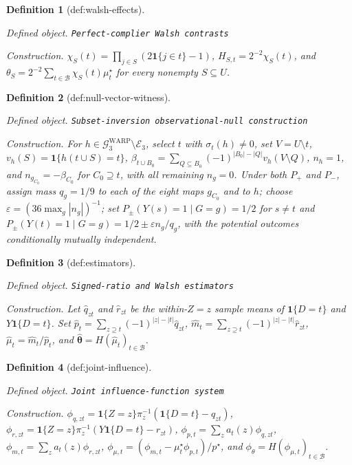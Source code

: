 \documentclass{article}
\newtheorem{definition}{Definition}
\begin{document}
\begin{definition}[def:walsh-effects]\label{def:walsh-effects}
\par\smallskip\noindent\emph{Defined object.} \texttt{Perfect-\allowbreak{}complier Walsh contrasts}
\par\smallskip\noindent\emph{Construction.} \(\chi_S(t)=\prod_{j\in S}(2\mathbf 1\{j\in t\}-1)\), \(H_{S,t}=2^{-2}\chi_S(t)\), and \(\theta_S=2^{-2}\sum_{t\in\mathcal B}\chi_S(t)\mu_t^\star\) for every nonempty \(S\subseteq U\).
\end{definition}

\begin{definition}[def:null-vector-witness]\label{def:null-vector-witness}
\par\smallskip\noindent\emph{Defined object.} \texttt{Subset-\allowbreak{}inversion observational-\allowbreak{}null construction}
\par\smallskip\noindent\emph{Construction.} For \(h\in\mathcal G^{\mathrm{WARP}}_3\setminus\mathcal E_3\), select \(t\) with \(\sigma_t(h)\ne0\), set \(V=U\setminus t\), \(v_h(S)=\mathbf 1\{h(t\cup S)=t\}\), \(\beta_{t\cup B_0}=\sum_{Q\subseteq B_0}(-1)^{|B_0|-|Q|}v_h(V\setminus Q)\), \(n_h=1\), and \(n_{g_{C_0}}=-\beta_{C_0}\) for \(C_0\supseteq t\), with all remaining \(n_g=0\). Under both \(P_+\) and \(P_-\), assign mass \(q_g=1/9\) to each of the eight maps \(g_{C_0}\) and to \(h\); choose \(\varepsilon=(36\max_g|n_g|)^{-1}\); set \(P_\pm(Y(s)=1\mid G=g)=1/2\) for \(s\ne t\) and \(P_\pm(Y(t)=1\mid G=g)=1/2\pm\varepsilon n_g/q_g\), with the potential outcomes conditionally mutually independent.
\end{definition}

\begin{definition}[def:estimators]\label{def:estimators}
\par\smallskip\noindent\emph{Defined object.} \texttt{Signed-\allowbreak{}ratio and Walsh estimators}
\par\smallskip\noindent\emph{Construction.} Let \(\widehat q_{zt}\) and \(\widehat r_{zt}\) be the within-\(Z=z\) sample means of \(\mathbf 1\{D=t\}\) and \(Y\mathbf 1\{D=t\}\). Set \(\widehat p_t=\sum_{z\supseteq t}(-1)^{|z|-|t|}\widehat q_{zt}\), \(\widehat m_t=\sum_{z\supseteq t}(-1)^{|z|-|t|}\widehat r_{zt}\), \(\widehat\mu_t=\widehat m_t/\widehat p_t\), and \(\widehat{\boldsymbol\theta}=H(\widehat\mu_t)_{t\in\mathcal B}\).
\end{definition}

\begin{definition}[def:joint-influence]\label{def:joint-influence}
\par\smallskip\noindent\emph{Defined object.} \texttt{Joint influence-\allowbreak{}function system}
\par\smallskip\noindent\emph{Construction.} \(\phi_{q,zt}=\mathbf 1\{Z=z\}\pi_z^{-1}(\mathbf 1\{D=t\}-q_{zt})\), \(\phi_{r,zt}=\mathbf 1\{Z=z\}\pi_z^{-1}(Y\mathbf 1\{D=t\}-r_{zt})\), \(\phi_{p,t}=\sum_z a_t(z)\phi_{q,zt}\), \(\phi_{m,t}=\sum_z a_t(z)\phi_{r,zt}\), \(\phi_{\mu,t}=(\phi_{m,t}-\mu_t^\star\phi_{p,t})/p^\star\), and \(\phi_{\theta}=H(\phi_{\mu,t})_{t\in\mathcal B}\).
\end{definition}
\end{document}

